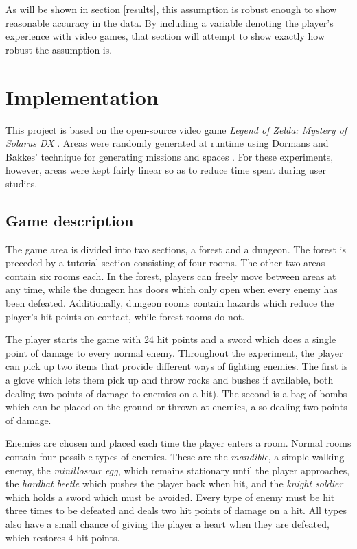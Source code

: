 \documentclass[a4paper]{article}
\begin{document}
\begin{multicols*}{2}
As will be shown in section \ref{results}, this assumption is robust enough to show reasonable accuracy in the data. By including a variable denoting the player's experience with video games, that section will attempt to show exactly how robust the assumption is.

\section{Implementation}
This project is based on the open-source video game \emph{Legend of Zelda: Mystery of Solarus DX} \cite{zeldasolarus}. Areas were randomly generated at runtime using Dormans and Bakkes' technique for generating missions and spaces \cite{missiongrammar}. For these experiments, however, areas were kept fairly linear so as to reduce time spent during user studies. 

\subsection{Game description}
The game area is divided into two sections, a forest and a dungeon. The forest is preceded by a tutorial section consisting of four rooms. The other two areas contain six rooms each. In the forest, players can freely move between areas at any time, while the dungeon has doors which only open when every enemy has been defeated. Additionally, dungeon rooms contain hazards which reduce the player's hit points on contact, while forest rooms do not.

The player starts the game with 24 hit points and a sword which does a single point of damage to every normal enemy. Throughout the experiment, the player can pick up two items that provide different ways of fighting enemies. The first is a glove which lets them pick up and throw rocks and bushes if available, both dealing two points of damage to enemies on a hit). The second is a bag of bombs which can be placed on the ground or thrown at enemies, also dealing two points of damage. 

Enemies are chosen and placed each time the player enters a room. Normal rooms contain four possible types of enemies. These are the \emph{mandible}, a simple walking enemy, the \emph{minillosaur egg}, which remains stationary until the player approaches, the \emph{hardhat beetle} which pushes the player back when hit, and the \emph{knight soldier} which holds a sword which must be avoided. Every type of enemy must be hit three times to be defeated and deals two hit points of damage on a hit. All types also have a small chance of giving the player a heart when they are defeated, which restores 4 hit points.


\end{multicols*}
\end{document}

